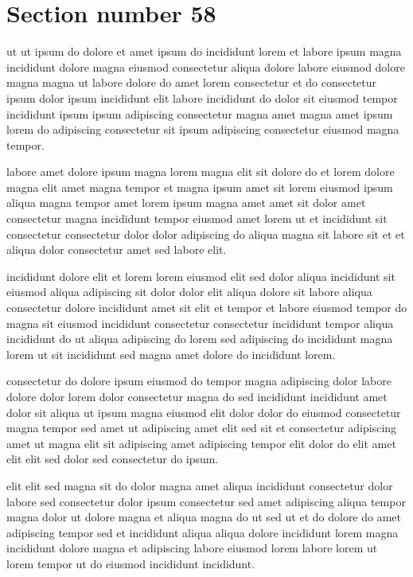 \documentclass{article}
\begin{document}
\section{Section number 58}\label{sec:58}
ut ut ipsum do dolore et amet ipsum do incididunt lorem et labore ipsum magna incididunt dolore magna eiusmod consectetur aliqua dolore labore eiusmod dolore magna magna ut labore dolore do amet lorem consectetur et do consectetur ipsum dolor ipsum incididunt elit labore incididunt do dolor sit eiusmod tempor incididunt ipsum ipsum adipiscing consectetur magna amet magna amet ipsum lorem do adipiscing consectetur sit ipsum adipiscing consectetur eiusmod magna tempor.

labore amet dolore ipsum magna lorem magna elit sit dolore do et lorem dolore magna elit amet magna tempor et magna ipsum amet sit lorem eiusmod ipsum aliqua magna tempor amet lorem ipsum magna amet amet sit dolor amet consectetur magna incididunt tempor eiusmod amet lorem ut et incididunt sit consectetur consectetur dolor dolor adipiscing do aliqua magna sit labore sit et et aliqua dolor consectetur amet sed labore elit.

incididunt dolore elit et lorem lorem eiusmod elit sed dolor aliqua incididunt sit eiusmod aliqua adipiscing sit dolor dolor elit aliqua dolore sit labore aliqua consectetur dolore incididunt amet sit elit et tempor et labore eiusmod tempor do magna sit eiusmod incididunt consectetur consectetur incididunt tempor aliqua incididunt do ut aliqua adipiscing do lorem sed adipiscing do incididunt magna lorem ut sit incididunt sed magna amet dolore do incididunt lorem.

consectetur do dolore ipsum eiusmod do tempor magna adipiscing dolor labore dolore dolor lorem dolor consectetur magna do sed incididunt incididunt amet dolor sit aliqua ut ipsum magna eiusmod elit dolor dolor do eiusmod consectetur magna tempor sed amet ut adipiscing amet elit sed sit et consectetur adipiscing amet ut magna elit sit adipiscing amet adipiscing tempor elit dolor do elit amet elit elit sed dolor sed consectetur do ipsum.

elit elit sed magna sit do dolor magna amet aliqua incididunt consectetur dolor labore sed consectetur dolor ipsum consectetur sed amet adipiscing aliqua tempor magna dolor ut dolore magna et aliqua magna do ut sed ut et do dolore do amet adipiscing tempor sed et incididunt aliqua aliqua dolore incididunt lorem magna incididunt dolore magna et adipiscing labore eiusmod lorem labore lorem ut lorem tempor ut do eiusmod incididunt incididunt.
\end{document}
